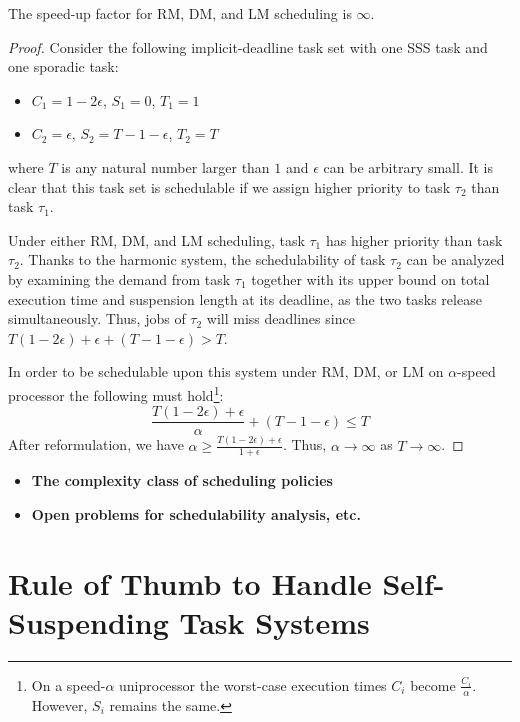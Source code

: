 \begin{theorem}
The speed-up factor for RM, DM, and LM scheduling is $\infty$.
\end{theorem}
\begin{proof}
Consider the following implicit-deadline task set with one SSS task and one sporadic task:
\begin{itemize}
 \setlength\itemsep{0em}
\item $C_1=1-2\epsilon$, $S_1=0$, $T_1=1$
\item  $C_2=\epsilon$, $S_2=T-1-\epsilon$, $T_2=T$
\end{itemize}

where $T$ is any natural number larger than $1$ and $\epsilon$ can be arbitrary small.
It is clear that this task set is schedulable if we assign higher priority to
task $\tau_2$ than task $\tau_1$.

Under either RM, DM, and LM scheduling, task $\tau_1$ has higher priority than task $\tau_2$. 
Thanks to the harmonic system, the schedulability of task $\tau_2$ can be analyzed by examining the demand from task $\tau_1$ together with its upper bound on total execution time and suspension length at its deadline, as the two tasks release simultaneously.
Thus, jobs of $\tau_2$ will miss deadlines since $T( 1-2\epsilon)+\epsilon+(T-1-\epsilon) > T$.

In order to be schedulable upon this system under RM, DM, or LM on $\alpha$-speed processor the following must hold\footnote{On a speed-$\alpha$ uniprocessor the worst-case execution times $C_{i}$ become $\frac{C_{i}}{\alpha}$. However, $S_i$ remains the same.}:
\begin{equation*}
\frac{T( 1-2\epsilon)+\epsilon}{\alpha}+(T-1-\epsilon) \le T
\end{equation*}
After reformulation, we have $\alpha\ge \frac{T( 1-2\epsilon)+\epsilon}{1+\epsilon}$. Thus, $\alpha\rightarrow \infty$ as $T \rightarrow \infty$.
\end{proof}


   
\begin{itemize}
\item \textbf{The complexity class of scheduling policies}
\item \textbf{Open problems for schedulability analysis, etc.}
\end{itemize}
  
\section{Rule of Thumb to Handle Self-Suspending Task Systems}